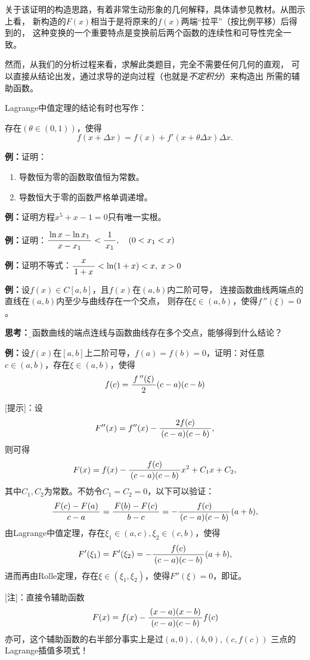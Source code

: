 关于该证明的构造思路，有着非常生动形象的几何解释，具体请参见教材。从图示上看，
新构造的$F(x)$相当于是将原来的$f(x)$两端“拉平”（按比例平移）后得到的，
这种变换的一个重要特点是变换前后两个函数的连续性和可导性完全一致。

然而，从我们的分析过程来看，求解此类题目，完全不需要任何几何的直观，
可以直接从结论出发，通过求导的逆向过程（也就是{\it 不定积分}）来构造出
所需的辅助函数。

Lagrange中值定理的结论有时也写作：
\begin{thx}
	存在$(\theta\in(0,1))$，使得
	$$f(x+\Delta x)=f(x)+f'(x+\theta\Delta x)\Delta x.$$
\end{thx}

{\bf 例：}证明：
\begin{enumerate}[(1)]
  \setlength{\itemindent}{1cm}
  \item 导数恒为零的函数取值恒为常数。
  \item 导数恒大于零的函数严格单调递增。
\end{enumerate}

{\bf 例：}证明方程$x^5+x-1=0$只有唯一实根。

{\bf 例：}证明：$\displaystyle\frac{\,{\ln x-\ln x_1}\,}{\,{x-x_1}\,}<\displaystyle\frac{\,{1}\,}{\,{x_1}\,},\quad (0<x_1<x)$

{\bf 例：}证明不等式：$\displaystyle\frac{\,{x}\,}{\,{1+x}\,}<\ln(1+x)<x,\;x>0$


{\bf 例：}设$f(x)\in C[a,b]$，且$f(x)$在$(a,b)$内二阶可导，
连接函数曲线两端点的直线在$(a,b)$内至少与曲线存在一个交点，
则存在$\xi\in(a,b)$，使得$f\,''(\xi)=0$。

{\bf 思考：}{\b 若函数曲线的端点连线与函数曲线存在多个交点，能够得到什么结论？}

{\bf 例：}设$f(x)$在$[a,b]$上二阶可导，$f(a)=f(b)=0$，证明：对任意
$c\in(a,b)$，存在$\xi\in(a,b)$，使得
$$f(c)=\displaystyle\frac{\,{f\,''(\xi)}\,}{\,{2}\,}(c-a)(c-b)$$

[提示]：设
$$F''(x)=f''(x)-\displaystyle\frac{\,{2f(c)}\,}{\,{(c-a)(c-b)}\,},$$
则可得
$$F(x)=f(x)-\displaystyle\frac{\,{f(c)}\,}{\,{(c-a)(c-b)}\,}x^2+C_1x+C_2,$$
其中$C_1,C_2$为常数。不妨令$C_1=C_2=0$，以下可以验证：
$$\displaystyle\frac{\,{F(c)-F(a)}\,}{\,{c-a}\,}=\displaystyle\frac{\,{F(b)-F(c)}\,}{\,{b-c}\,}
=-\displaystyle\frac{\,{f(c)}\,}{\,{(c-a)(c-b)}\,}(a+b),$$
由Lagrange中值定理，存在$\xi_1\in(a,c),\xi_2\in(c,b)$，使得
$$F'(\xi_1)=F'(\xi_2)=-\displaystyle\frac{\,{f(c)}\,}{\,{(c-a)(c-b)}\,}(a+b),$$
进而再由Rolle定理，存在$\xi\in(\xi_1,\xi_2)$，使得$F''(\xi)=0$，即证。

[注]：直接令辅助函数
$$F(x)=f(x)-\displaystyle\frac{\,{(x-a)(x-b)}\,}{\,{(c-a)(c-b)}\,}f(c)$$
亦可，这个辅助函数的右半部分事实上是过$(a,0),(b,0),(c,f(c))$
三点的{\kaishu Lagrange插值多项式}！

